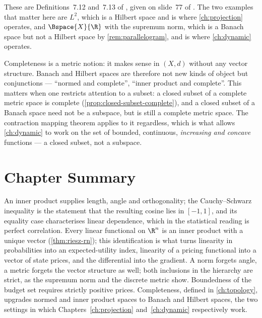 These are Definitions~7.12 and~7.13 of \textcite{fukuda2026notes}, given on
slide~77 of \autocite{fukuda2026analysis}. The two examples that matter here are
$L^2$, which is a Hilbert space and is where \autoref{ch:projection} operates,
and $\Bspace{X}{\R}$ with the supremum norm, which is a Banach space but not a
Hilbert space by \autoref{rem:parallelogram}, and is where \autoref{ch:dynamic}
operates.

\begin{remark}\label{rem:completeness-level}
	Completeness is a metric notion: it makes sense in $(X,d)$ without any vector
	structure. Banach and Hilbert spaces are therefore not new kinds of object but
	conjunctions --- ``normed and complete'', ``inner product and complete''. This
	matters when one restricts attention to a subset: a closed subset of a complete
	metric space is complete (\autoref{prop:closed-subset-complete}), and a closed
	subset of a Banach space need not be a subspace, but is still a complete metric
	space. The contraction mapping theorem applies to it regardless, which is what
	allows \autoref{ch:dynamic} to work on the set of bounded, continuous,
	\emph{increasing and concave} functions --- a closed subset, not a subspace.
\end{remark}

\section{Chapter Summary}\label{sec:met-summary}

An inner product supplies length, angle and orthogonality; the Cauchy--Schwarz
inequality is the statement that the resulting cosine lies in $[-1,1]$, and its
equality case characterises linear dependence, which in the statistical reading
is perfect correlation. Every linear functional on $\R^n$ is an inner product
with a unique vector (\autoref{thm:riesz-rn}); this identification is what turns
linearity in probabilities into an expected-utility index, linearity of a pricing
functional into a vector of state prices, and the differential into the gradient.
A norm forgets angle, a metric forgets the vector structure as well; both
inclusions in the hierarchy are strict, as the supremum norm and the discrete
metric show. Boundedness of the budget set requires strictly positive prices.
Completeness, defined in \autoref{ch:topology}, upgrades normed and inner product
spaces to Banach and Hilbert spaces, the two settings in which
Chapters~\ref{ch:projection} and~\ref{ch:dynamic} respectively work.

